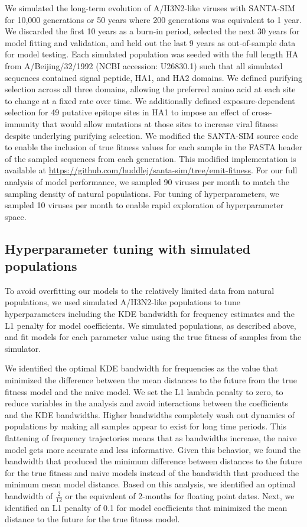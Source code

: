 We simulated the long-term evolution of A/H3N2-like viruses with SANTA-SIM \cite{Jariani2019} for 10,000 generations or 50 years where 200 generations was equivalent to 1 year.
We discarded the first 10 years as a burn-in period, selected the next 30 years for model fitting and validation, and held out the last 9 years as out-of-sample data for model testing.
Each simulated population was seeded with the full length HA from A/Beijing/32/1992 (NCBI accession: U26830.1) such that all simulated sequences contained signal peptide, HA1, and HA2 domains.
We defined purifying selection across all three domains, allowing the preferred amino acid at each site to change at a fixed rate over time.
We additionally defined exposure-dependent selection for 49 putative epitope sites in HA1 \cite{Luksza:2014hj} to impose an effect of cross-immunity that would allow mutations at those sites to increase viral fitness despite underlying purifying selection.
We modified the SANTA-SIM source code to enable the inclusion of true fitness values for each sample in the FASTA header of the sampled sequences from each generation.
This modified implementation is available at \url{https://github.com/huddlej/santa-sim/tree/emit-fitness}.
For our full analysis of model performance, we sampled 90 viruses per month to match the sampling density of natural populations.
For tuning of hyperparameters, we sampled 10 viruses per month to enable rapid exploration of hyperparameter space.

\subsection*{Hyperparameter tuning with simulated populations}

To avoid overfitting our models to the relatively limited data from natural populations, we used simulated A/H3N2-like populations to tune hyperparameters including the KDE bandwidth for frequency estimates and the L1 penalty for model coefficients.
We simulated populations, as described above, and fit models for each parameter value using the true fitness of samples from the simulator.

We identified the optimal KDE bandwidth for frequencies as the value that minimized the difference between the mean distances to the future from the true fitness model and the naive model.
We set the L1 lambda penalty to zero, to reduce variables in the analysis and avoid interactions between the coefficients and the KDE bandwidths.
Higher bandwidths completely wash out dynamics of populations by making all samples appear to exist for long time periods.
This flattening of frequency trajectories means that as bandwidths increase, the naive model gets more accurate and less informative.
Given this behavior, we found the bandwidth that produced the minimum difference between distances to the future for the true fitness and naive models instead of the bandwidth that produced the minimum mean model distance.
Based on this analysis, we identified an optimal bandwidth of $\frac{2}{12}$ or the equivalent of 2-months for floating point dates.
Next, we identified an L1 penalty of 0.1 for model coefficients that minimized the mean distance to the future for the true fitness model.

